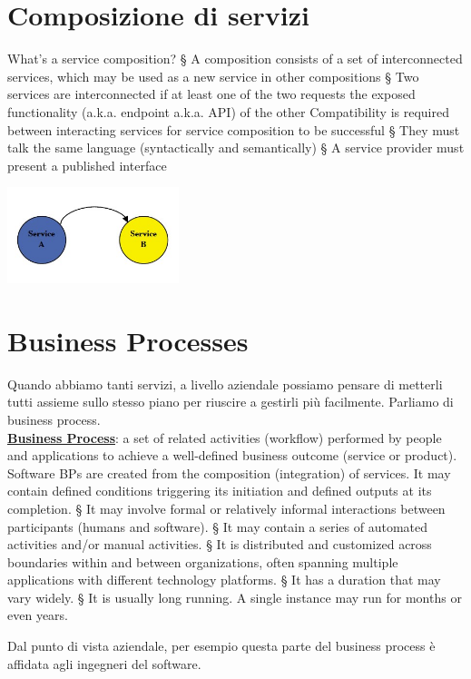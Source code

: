 \section{Composizione di servizi}
What's a service composition?
§ A composition consists of a set of interconnected services, which may be used as a new service in other compositions
§ Two services are interconnected if at least one of the two requests the exposed functionality (a.k.a. endpoint a.k.a. API) of the other
Compatibility is required between interacting services for service composition to be successful
§ They must talk the same language (syntactically and semantically)
§ A service provider must present a published interface
\begin{center}
    \includegraphics[width=0.375\textwidth]{img/ServicesComputing6.jpg}
\end{center}

\section{Business Processes}
Quando abbiamo tanti servizi, a livello aziendale possiamo pensare di metterli tutti assieme sullo stesso piano per riuscire a gestirli più facilmente. Parliamo di business process.
\\\underline{\textbf{Business Process}}: a set of related activities (workflow) performed by people and applications to achieve a well-defined business outcome (service or product).
\\Software BPs are created from the composition (integration) of services.
It may contain defined conditions triggering its initiation and defined outputs at its completion.
§ It may involve formal or relatively informal interactions between participants (humans and software).
§ It may contain a series of automated activities and/or manual activities.
§ It is distributed and customized across boundaries within and between organizations, often spanning multiple applications with different technology platforms.
§ It has a duration that may vary widely.
§ It is usually long running. A single instance may run for months or even years.

Dal punto di vista aziendale, per esempio questa parte del business process è affidata agli ingegneri del software.

